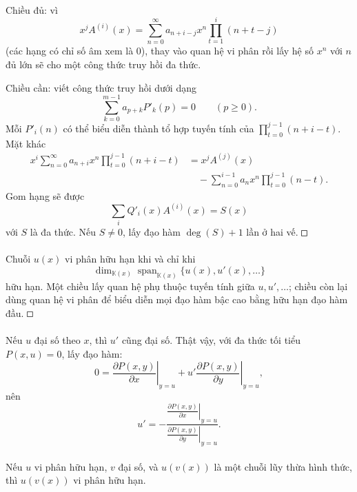\documentclass[11pt]{article}
\DeclareMathOperator{\spanop}{span}
\newcommand{\K}{\mathbb{K}}
\newcommand{\square}{\mathord{\vcenter{\hrule height .5pt
  \hbox{\vrule width .5pt height 5pt\kern5pt\vrule width .5pt}
  \hrule height .5pt}}}
\begin{document}
\paragraph{}
Chiều đủ: vì
\[
  x^jA^{(i)}(x)=\sum_{n=0}^{\infty}a_{n+i-j}x^n
  \prod_{t=1}^{i}(n+t-j)
\]
(các hạng có chỉ số âm xem là \(0\)), thay vào quan hệ vi phân rồi lấy hệ số
\(x^n\) với \(n\) đủ lớn sẽ cho một công thức truy hồi đa thức.

Chiều cần: viết công thức truy hồi dưới dạng
\[
  \sum_{k=0}^{m-1}a_{p+k}P'_k(p)=0\qquad(p\ge0).
\]
Mỗi \(P'_i(n)\) có thể biểu diễn thành tổ hợp tuyến tính của
\(\prod_{t=0}^{j-1}(n+i-t)\). Mặt khác
\[
\begin{aligned}
x^i\sum_{n=0}^{\infty}a_{n+i}x^n\prod_{t=0}^{j-1}(n+i-t)
&=x^jA^{(j)}(x)\\
&\quad-\sum_{n=0}^{i-1}a_nx^n\prod_{t=0}^{j-1}(n-t).
\end{aligned}
\]
Gom hạng sẽ được
\[
  \sum_i Q'_i(x)A^{(i)}(x)=S(x)
\]
với \(S\) là đa thức. Nếu \(S\ne0\), lấy đạo hàm \(\deg(S)+1\) lần ở hai vế.
\(\square\)

\paragraph{}
Chuỗi \(u(x)\) vi phân hữu hạn khi và chỉ khi
\[
  \dim_{\K(x)}\spanop_{\K(x)}\{u(x),u'(x),\ldots\}
\]
hữu hạn. Một chiều lấy quan hệ phụ thuộc tuyến tính giữa \(u,u',\ldots\); chiều
còn lại dùng quan hệ vi phân để biểu diễn mọi đạo hàm bậc cao bằng hữu hạn đạo
hàm đầu. \(\square\)

\paragraph{}
Nếu \(u\) đại số theo \(x\), thì \(u'\) cũng đại số. Thật vậy, với đa thức tối
tiểu \(P(x,u)=0\), lấy đạo hàm:
\[
  0=\left.\frac{\partial P(x,y)}{\partial x}\right|_{y=u}
  +u'\left.\frac{\partial P(x,y)}{\partial y}\right|_{y=u},
\]
nên
\[
  u'=-\frac{\left.\frac{\partial P(x,y)}{\partial x}\right|_{y=u}}
          {\left.\frac{\partial P(x,y)}{\partial y}\right|_{y=u}}.
\]

\paragraph{}
Nếu \(u\) vi phân hữu hạn, \(v\) đại số, và \(u(v(x))\) là một chuỗi lũy thừa
hình thức, thì \(u(v(x))\) vi phân hữu hạn.
\end{document}
